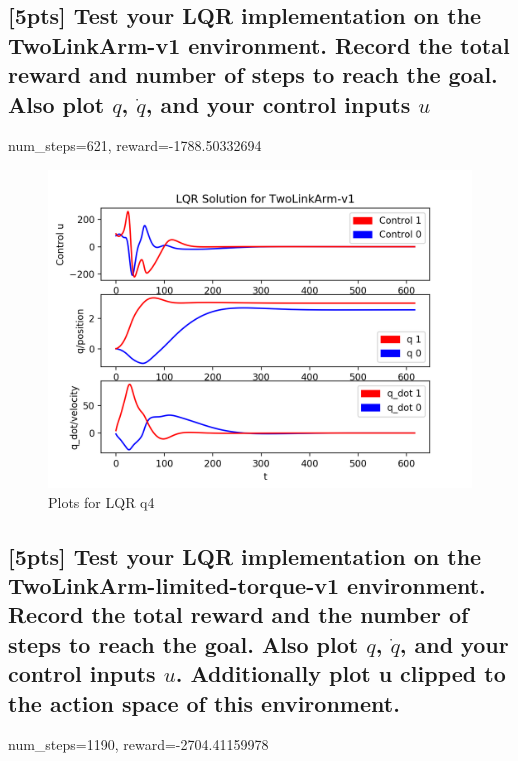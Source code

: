 \documentclass{article}
\begin{document}
\subsection{[5pts] Test your LQR implementation on the TwoLinkArm-v1 environment. Record the total reward and number of steps to reach the goal. Also plot $q$, $\dot{q}$, and your control inputs $u$}

num\_steps=621, reward=-1788.50332694

\begin{figure}[H] \label{fig:lqr_qn4}
  \centering
  \includegraphics[width=1.2\textwidth]{images/lqr_qn4}
  \caption{Plots for LQR q4}
\end{figure}

\subsection{[5pts] Test your LQR implementation on the TwoLinkArm-limited-torque-v1 environment. Record the total reward and the number of steps to reach the goal. Also plot $q$, $\dot{q}$, and your control inputs $u$. Additionally plot u clipped to the action space of this environment.}

num\_steps=1190, reward=-2704.41159978
\end{document}
